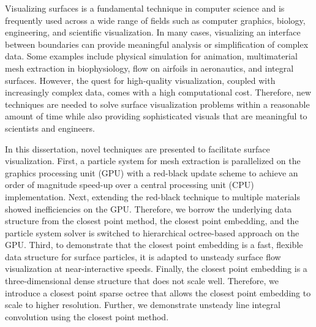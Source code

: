 Visualizing surfaces is a fundamental technique in computer science and is frequently used across a wide range of fields such as computer graphics, biology, engineering, and scientific visualization. In many cases, visualizing an interface between boundaries can provide meaningful analysis or simplification of complex data. Some examples include physical simulation for animation, multimaterial mesh extraction in biophysiology, flow on airfoils in aeronautics, and integral surfaces. However, the quest for high-quality visualization, coupled with increasingly complex data, comes with a high computational cost. Therefore, new techniques are needed to solve surface visualization problems within a reasonable amount of time while also providing sophisticated visuals that are meaningful to scientists and engineers.

In this dissertation, novel techniques are presented to facilitate surface visualization. First, a particle system for mesh extraction is parallelized on the graphics processing unit (GPU) with a red-black update scheme to achieve an order of magnitude speed-up over a central processing unit (CPU) implementation. Next, extending the red-black technique to multiple materials showed inefficiencies on the GPU. Therefore, we borrow the underlying data structure from the closest point method, the closest point embedding, and the particle system solver is switched to hierarchical octree-based approach on the GPU. Third, to demonstrate that the closest point embedding is a fast, flexible data structure for surface particles, it is adapted to unsteady surface flow visualization at near-interactive speeds. Finally, the closest point embedding is a three-dimensional dense structure that does not scale well. Therefore, we introduce a closest point sparse octree that allows the closest point embedding to scale to higher resolution. Further, we demonstrate unsteady line integral convolution using the closest point method.
